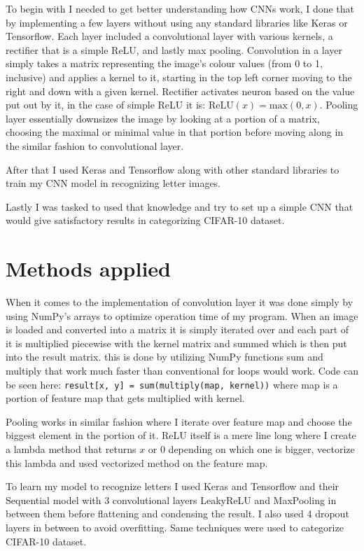 \documentclass[conference]{IEEEtran}
\begin{document}
To begin with I needed to get better understanding how CNNs work, I done that by implementing a few layers without using any standard libraries like Keras or Tensorflow. Each layer included a convolutional layer with various kernels, a rectifier that is a simple ReLU, and lastly max pooling. Convolution in a layer simply takes a matrix representing the image's colour values (from 0 to 1, inclusive) and  applies a kernel to it, starting in the top left corner moving to the right and down with a given kernel. Rectifier activates neuron based on the value put out by it, in the case of simple ReLU it is: $\text{ReLU}(x) = \text{max}(0,x)$. Pooling layer essentially downsizes the image by looking at a portion of a matrix, choosing the maximal or minimal value in that portion before moving along in the similar fashion to convolutional layer.

After that I used Keras and Tensorflow along with other standard libraries to train my CNN model in recognizing letter images.

Lastly I was tasked to used that knowledge and try to set up a simple CNN that would give satisfactory results in categorizing CIFAR-10 dataset.

\section{Methods applied}
When it comes to the implementation of convolution layer it was done simply by using NumPy's arrays to optimize operation time of my program. When an image is loaded and converted into a matrix it is simply iterated over and each part of it is multiplied piecewise with the kernel matrix and summed which is then put into the result matrix. this is done by utilizing NumPy functions sum and multiply that work much faster than conventional for loops would work. Code can be seen here: \verb|result[x, y] = sum(multiply(map, kernel))| where map is a portion of feature map that gets multiplied with kernel.

Pooling works in similar fashion where I iterate over feature map and choose the biggest element in the portion of it. ReLU itself is a mere line long where I create a lambda method that returns $x$ or $0$ depending on which one is bigger, vectorize this lambda and used vectorized method on the feature map.

To learn my model to recognize letters I used Keras and Tensorflow and their Sequential model with 3 convolutional layers LeakyReLU and MaxPooling in between them before flattening and condensing the result. I also used 4 dropout layers in between to avoid overfitting. Same techniques were used to categorize CIFAR-10 dataset.
\end{document}
